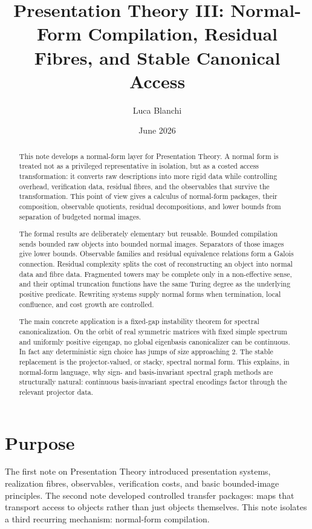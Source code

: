 \documentclass[11pt]{article}
\title{Presentation Theory III: Normal-Form Compilation, Residual Fibres, and Stable Canonical Access}
\author{Luca Blanchi}
\date{June 2026}
\begin{document}
\maketitle

\begin{abstract}
This note develops a normal-form layer for Presentation Theory. A normal form is treated not as a privileged representative in isolation, but as a costed access transformation: it converts raw descriptions into more rigid data while controlling overhead, verification data, residual fibres, and the observables that survive the transformation. This point of view gives a calculus of normal-form packages, their composition, observable quotients, residual decompositions, and lower bounds from separation of budgeted normal images.

The formal results are deliberately elementary but reusable. Bounded compilation sends bounded raw objects into bounded normal images. Separators of those images give lower bounds. Observable families and residual equivalence relations form a Galois connection. Residual complexity splits the cost of reconstructing an object into normal data and fibre data. Fragmented towers may be complete only in a non-effective sense, and their optimal truncation functions have the same Turing degree as the underlying positive predicate. Rewriting systems supply normal forms when termination, local confluence, and cost growth are controlled.

The main concrete application is a fixed-gap instability theorem for spectral canonicalization. On the orbit of real symmetric matrices with fixed simple spectrum and uniformly positive eigengap, no global eigenbasis canonicalizer can be continuous. In fact any deterministic sign choice has jumps of size approaching \(2\). The stable replacement is the projector-valued, or stacky, spectral normal form. This explains, in normal-form language, why sign- and basis-invariant spectral graph methods are structurally natural: continuous basis-invariant spectral encodings factor through the relevant projector data.
\end{abstract}

\section{Purpose}

The first note on Presentation Theory introduced presentation systems, realization fibres, observables, verification costs, and basic bounded-image principles. The second note developed controlled transfer packages: maps that transport access to objects rather than just objects themselves. This note isolates a third recurring mechanism: normal-form compilation.
\end{document}
